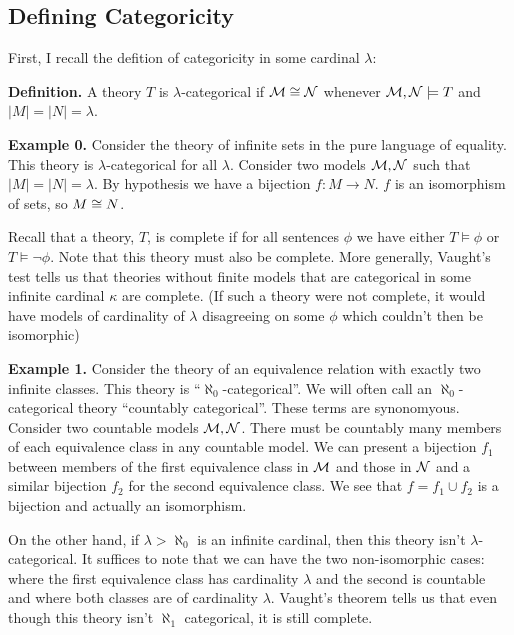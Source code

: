 \subsection{Defining Categoricity}

First, I recall the defition of categoricity in some cardinal \(\lambda\):

\textbf{Definition.} A theory \(T\) is \(\lambda\)-categorical if \(\mathcal{M} \cong \mathcal{N}\) whenever \(\mathcal{M}, \mathcal{N} \models T\) and \(|M| = |N| = \lambda\).

\textbf{Example 0.} Consider the theory of infinite sets in the pure language of equality. 
This theory is \(\lambda\)-categorical for all \(\lambda\).
Consider two models \(\mathcal{M}, \mathcal{N}\) such that \(|M|=|N|=\lambda\). 
By hypothesis we have a bijection \(f: M \to N\). \(f\) is an isomorphism of sets, so \(M \cong N\).

Recall that a theory, \(T\), is complete if for all sentences \(\phi\) we have either \(T \models \phi\) or \(T \models \neg \phi\). 
Note that this theory must also be complete. 
More generally, Vaught's test tells us that theories without finite models that are categorical in some infinite cardinal \(\kappa\) are complete. 
(If such a theory were not complete, it would have models of cardinality of \(\lambda\) disagreeing on some \(\phi\) which couldn't then be isomorphic)

\textbf{Example 1.} Consider the theory of an equivalence relation with exactly two infinite classes. 
This theory is ``\(\aleph_0\)-categorical''.
We will often call an \(\aleph_0\)-categorical theory ``countably categorical''.
These terms are synonomyous.  
Consider two countable models \(\mathcal{M}, \mathcal{N}\). 
There must be countably many members of each equivalence class in any countable model. 
We can present a bijection \(f_1\) between members of the first equivalence class in  \(\mathcal{M}\) and those in \(\mathcal{N}\) and a similar bijection \(f_2\) for the second equivalence class. 
We see that \(f = f_1 \cup f_2\) is a bijection and actually an isomorphism. 

On the other hand, if \(\lambda > \aleph_0\) is an infinite cardinal, then this theory isn't \(\lambda\)-categorical. 
It suffices to note that we can have the two non-isomorphic cases: where the first equivalence class has cardinality \(\lambda\) and the second is countable 
and where both classes are of cardinality \(\lambda\). Vaught's theorem tells us that even though this theory isn't \(\aleph_1\) categorical, it is still complete. 

